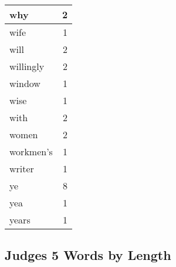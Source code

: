 \begin{center}
\begin{longtable}{l|r}
why & 2\\ \hline 
wife & 1\\ \hline 
will & 2\\ \hline 
willingly & 2\\ \hline 
window & 1\\ \hline 
wise & 1\\ \hline 
with & 2\\ \hline 
women & 2\\ \hline 
workmen's & 1\\ \hline 
writer & 1\\ \hline 
ye & 8\\ \hline 
yea & 1\\ \hline 
years & 1\\ \hline 
\end{longtable}
\end{center}





\subsection{Judges 5 Words by Length}


\normalsize
 
